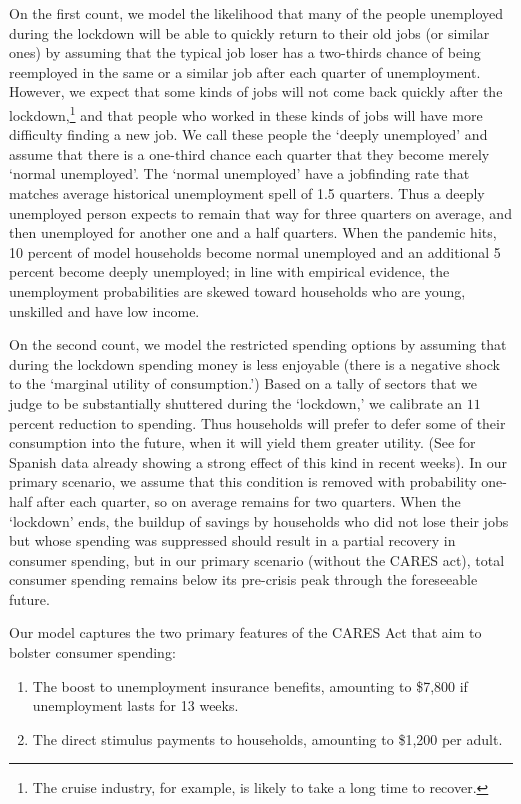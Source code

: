 \documentclass[titlepage]{\econtex}
\begin{document}
On the first count, we model the likelihood that many of the people unemployed during the lockdown will be able to quickly return to their old jobs (or similar ones) by assuming that the typical job loser has a two-thirds chance of being reemployed in the same or a similar job after each quarter of unemployment.  However, we expect that some kinds of jobs will not come back quickly after the lockdown,\footnote{The cruise industry, for example, is likely to take a long time to recover.} and that people who worked in these kinds of jobs will have more difficulty finding a new job.  We call these people the `deeply unemployed' and assume that there is a one-third chance each quarter that they become merely `normal unemployed'.  The `normal unemployed' have a jobfinding rate that matches average historical unemployment spell of 1.5 quarters.  Thus a deeply unemployed person expects to remain that way for three quarters on average, and then unemployed for another one and a half quarters.  When the pandemic hits, 10 percent of model households become normal unemployed and an additional 5 percent become deeply unemployed; in line with empirical evidence, the unemployment probabilities are skewed toward households who are young, unskilled and have low income.

On the second count, we model the restricted spending options by assuming that during the lockdown spending money is less enjoyable (there is a negative shock to the `marginal utility of consumption.')
Based on a tally of sectors that we judge to be substantially shuttered during the `lockdown,' we calibrate an $11$ percent reduction to spending.
Thus households will prefer to defer some of their consumption into the future, when it will yield them greater utility. (See \cite{SpanishSpending} for Spanish data already showing a strong effect of this kind in recent weeks).
In our primary scenario, we assume that this condition is removed with probability one-half after each quarter, so on average remains for two quarters.  When the `lockdown' ends, the buildup of savings by households who did not lose their jobs but whose spending was suppressed should result in a partial recovery in consumer spending, but in our primary scenario (without the CARES act), total consumer spending remains below its pre-crisis peak through the foreseeable future.  

Our model captures the two primary features of the CARES Act that aim to bolster consumer spending:
\begin{enumerate}
\item The boost to unemployment insurance benefits, amounting to \$7,800 if unemployment lasts for 13 weeks.
\item The direct stimulus payments to households, amounting to \$1,200 per adult.
\end{enumerate}
\end{document}
